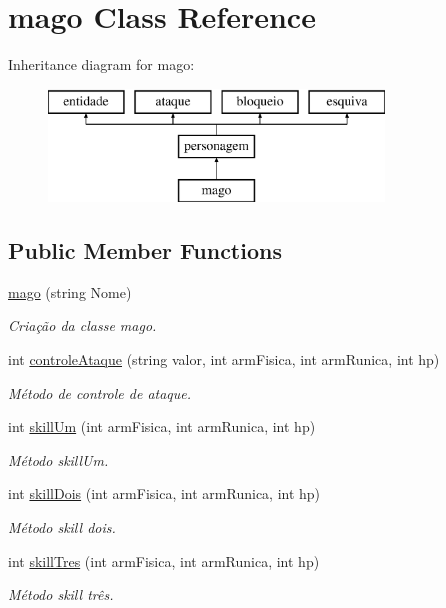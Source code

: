 \hypertarget{classmago}{}\section{mago Class Reference}
\label{classmago}
Inheritance diagram for mago\+:\begin{figure}[H]
\begin{center}
\leavevmode
\includegraphics[height=3.000000cm]{classmago}
\end{center}
\end{figure}
\subsection*{Public Member Functions}
\begin{DoxyCompactItemize}
\item 
\mbox{\hyperlink{classmago_ae5292ae10f4e5cae0a4a73d185807fbc}{mago}} (string Nome)
\begin{DoxyCompactList}\small\item\em Criação da classe mago. \end{DoxyCompactList}\item 
int \mbox{\hyperlink{classmago_af10f6c9bcbbf77870f376a48b1cd0601}{controle\+Ataque}} (string valor, int arm\+Fisica, int arm\+Runica, int hp)
\begin{DoxyCompactList}\small\item\em Método de controle de ataque. \end{DoxyCompactList}\item 
int \mbox{\hyperlink{classmago_a039c9975fad5dbc54d5f3ab51bf3df44}{skill\+Um}} (int arm\+Fisica, int arm\+Runica, int hp)
\begin{DoxyCompactList}\small\item\em Método skill\+Um. \end{DoxyCompactList}\item 
int \mbox{\hyperlink{classmago_ac0a8309b459ab7f27f356eff72817c2f}{skill\+Dois}} (int arm\+Fisica, int arm\+Runica, int hp)
\begin{DoxyCompactList}\small\item\em Método skill dois. \end{DoxyCompactList}\item 
int \mbox{\hyperlink{classmago_a77280ba40aac7fdf8766950261821a39}{skill\+Tres}} (int arm\+Fisica, int arm\+Runica, int hp)
\begin{DoxyCompactList}\small\item\em Método skill três. \end{DoxyCompactList}\end{DoxyCompactItemize}


